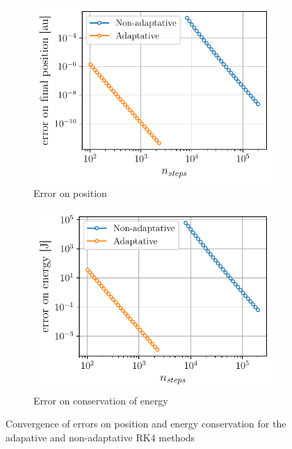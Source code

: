\begin{figure}[h]
    \centering
    \begin{subfigure}{0.49\linewidth}
        \centering
        \includegraphics[width=\linewidth]{figures/transfert_error_pos.pdf}
        \caption{Error on position}
        \label{fig:transfert_error_pos}
    \end{subfigure}
    \begin{subfigure}{0.49\linewidth}
        \centering
        \includegraphics[width=\linewidth]{figures/transfert_error_energy.pdf}
        \caption{Error on conservation of energy}
        \label{fig:transfert_error_energy}
    \end{subfigure}
    \caption{Convergence of errors on position and energy conservation for the adapative and non-adaptative RK4 methods}
    \label{fig:transfert_errors}
\end{figure}

